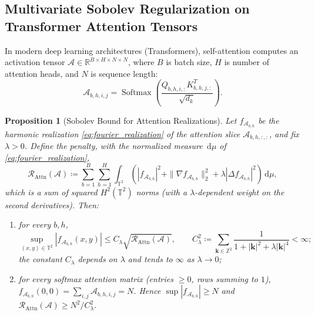 \documentclass[11pt,a4paper,reqno]{amsart}
\newtheorem{proposition}[theorem]{Proposition}
\theoremstyle{definition}
\numberwithin{equation}{section}
\providecommand{\R}{\mathbb{R}}
\newcommand{\Z}{\mathbb{Z}}
\newcommand{\Tor}{\mathbb{T}}
\newcommand{\dif}{\,\mathrm{d}}
\begin{document}
\subsection{Multivariate Sobolev Regularization on Transformer Attention Tensors}
\label{subsec:transformer_tensors}

In modern deep learning architectures (Transformers), self-attention computes an activation tensor $\mathcal{A} \in \R^{B \times H \times N \times N}$, where $B$ is batch size, $H$ is number of attention heads, and $N$ is sequence length:
\begin{equation}
    \mathcal{A}_{b, h, i, j} = \operatorname{Softmax}\left( \frac{Q_{b, h, i, :} K_{b, h, j, :}^T}{\sqrt{d_k}} \right).
\end{equation}

\begin{proposition}[Sobolev Bound for Attention Realizations]
\label{thm:attention_sobolev}
Let $f_{\mathcal{A}_{b,h}}$ be the harmonic realization \eqref{eq:fourier_realization} of the attention slice $\mathcal{A}_{b, h, :, :}$, and fix $\lambda > 0$. Define the penalty, with the normalized measure $\dif\mu$ of \eqref{eq:fourier_realization},
\begin{equation}
    \mathcal{R}_{\mathrm{Attn}}(\mathcal{A}) \coloneqq \sum_{b=1}^B \sum_{h=1}^H \int_{\Tor^2} \left( |f_{\mathcal{A}_{b,h}}|^2 + \|\nabla f_{\mathcal{A}_{b,h}}\|_2^2 + \lambda |\Delta f_{\mathcal{A}_{b,h}}|^2 \right) \dif \mu,
\end{equation}
which is a sum of squared $H^2(\Tor^2)$ norms (with a $\lambda$-dependent weight on the second derivatives). Then:
\begin{enumerate}[label=(\roman*)]
    \item for every $b, h$,
    \begin{equation}
        \label{eq:attention_sup_bound}
        \sup_{(x, y) \in \Tor^2} |f_{\mathcal{A}_{b,h}}(x, y)| \le C_\lambda \sqrt{\mathcal{R}_{\mathrm{Attn}}(\mathcal{A})}, \qquad C_\lambda^2 \coloneqq \sum_{\mathbf{k} \in \Z^2} \frac{1}{1 + |\mathbf{k}|^2 + \lambda |\mathbf{k}|^4} < \infty;
    \end{equation}
    the constant $C_\lambda$ depends on $\lambda$ and tends to $\infty$ as $\lambda \to 0$;
    \item for every softmax attention matrix (entries $\ge 0$, rows summing to $1$), $f_{\mathcal{A}_{b,h}}(0,0) = \sum_{i,j} \mathcal{A}_{b,h,i,j} = N$. Hence $\sup |f_{\mathcal{A}_{b,h}}| \ge N$ and $\mathcal{R}_{\mathrm{Attn}}(\mathcal{A}) \ge N^2 / C_\lambda^2$.
\end{enumerate}
\end{proposition}
\end{document}

